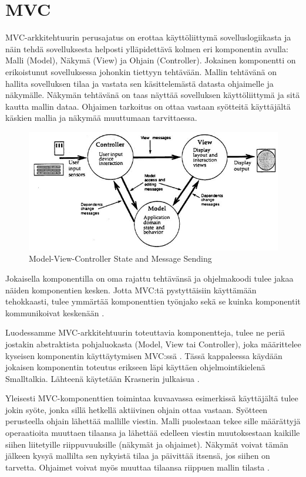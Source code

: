 \documentclass[utf8]{gradu3}
\begin{document}
\chapter{MVC}
MVC-arkkitehtuurin perusajatus on erottaa käyttöliittymä sovelluslogiikasta ja
näin tehdä sovelluksesta helposti ylläpidettävä kolmen eri komponentin avulla:
Malli (Model), Näkymä (View) ja Ohjain (Controller). Jokainen komponentti on
erikoistunut sovelluksessa johonkin tiettyyn tehtävään. Mallin tehtävänä on
hallita sovelluksen tilaa ja vastata sen käsittelemästä datasta ohjaimelle ja näkymälle.
Näkymän tehtävänä on taas näyttää sovelluksen käyttöliittymä ja sitä kautta mallin dataa. 
Ohjaimen tarkoitus on ottaa vastaan syötteitä käyttäjältä käskien mallia ja näkymää muuttumaan tarvittaessa.

\begin{figure}[h]
\centering
\includegraphics[scale=0.85]{krasner_mvc.jpg}
\caption{Model-View-Controller State and Message Sending \cite[s. 5]{krasner_desc}}
\end{figure} 
Jokaisella komponentilla on oma rajattu tehtävänsä ja ohjelmakoodi tulee jakaa näiden komponentien kesken. Jotta MVC:tä pystyttäisiin käyttämään
tehokkaasti, tulee ymmärtää komponenttien työnjako sekä se kuinka komponentit kommunikoivat keskenään \parencite{burbeck}. 

Luodessamme MVC-arkkitehtuurin toteuttavia komponentteja, tulee ne periä jostakin abstraktista pohjaluokasta (Model, View tai Controller), joka määrittelee kyseisen komponentin käyttäytymisen MVC:ssä  \parencite[s. 5]{krasner_desc}.  Tässä kappaleessa käydään jokaisen komponentin toteutus erikseen läpi käyttäen ohjelmointikielenä Smalltalkia. Lähteenä käytetään Krasnerin julkaisua \parencite{krasner_desc}.

Yleisesti MVC-komponenttien toimintaa kuvaavassa esimerkissä käyttäjältä tulee jokin syöte, jonka sillä hetkellä aktiivinen ohjain ottaa vastaan. Syötteen perusteella ohjain lähettää mallille viestin. Malli puolestaan tekee sille määrättyjä operaatioita muuttaen tilaansa ja lähettää edelleen viestin muutoksestaan kaikille siihen liitetyille riippuvuuksille (näkymät ja ohjaimet). Näkymät
voivat tämän jälkeen kysyä mallilta sen nykyistä tilaa ja päivittää itsensä, jos siihen on tarvetta. Ohjaimet voivat myös muuttaa tilaansa riippuen mallin tilasta \parencite[s. 4]{krasner_desc}. 
\end{document}

